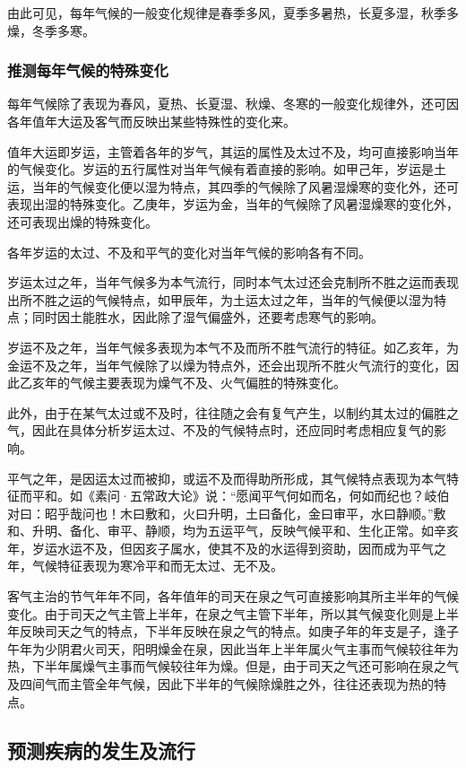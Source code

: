 \documentclass[12pt]{ctexbook}
\begin{document}
由此可见，每年气候的一般变化规律是春季多风，夏季多暑热，长夏多湿，秋季多燥，冬季多寒。

\subsubsection{推测每年气候的特殊变化}%

每年气候除了表现为春风，夏热、长夏湿、秋燥、冬寒的一般变化规律外，还可因各年值年大运及客气而反映出某些特殊性的变化来。

值年大运即岁运，主管着各年的岁气，其运的属性及太过不及，均可直接影响当年的气候变化。岁运的五行属性对当年气候有着直接的影响。如甲己年，岁运是土运，当年的气候变化便以湿为特点，其四季的气候除了风暑湿燥寒的变化外，还可表现出湿的特殊变化。乙庚年，岁运为金，当年的气候除了风暑湿燥寒的变化外，还可表现出燥的特殊变化。

各年岁运的太过、不及和平气的变化对当年气候的影响各有不同。

岁运太过之年，当年气候多为本气流行，同时本气太过还会克制所不胜之运而表现出所不胜之运的气候特点，如甲辰年，为土运太过之年，当年的气候便以湿为特点；同时因土能胜水，因此除了湿气偏盛外，还要考虑寒气的影响。

岁运不及之年，当年气候多表现为本气不及而所不胜气流行的特征。如乙亥年，为金运不及之年，当年气候除了以燥为特点外，还会出现所不胜火气流行的变化，因此乙亥年的气候主要表现为燥气不及、火气偏胜的特殊变化。

此外，由于在某气太过或不及时，往往随之会有复气产生，以制约其太过的偏胜之气，因此在具体分析岁运太过、不及的气候特点时，还应同时考虑相应复气的影响。

平气之年，是因运太过而被抑，或运不及而得助所形成，其气候特点表现为本气特征而平和。如《素问·五常政大论》说：“愿闻平气何如而名，何如而纪也？岐伯对曰：昭乎哉问也！木曰敷和，火曰升明，土曰备化，金曰审平，水曰静顺。”敷和、升明、备化、审平、静顺，均为五运平气，反映气候平和、生化正常。如辛亥年，岁运水运不及，但因亥子属水，使其不及的水运得到资助，因而成为平气之年，气候特征表现为寒冷平和而无太过、无不及。

客气主治的节气年年不同，各年值年的司天在泉之气可直接影响其所主半年的气候变化。由于司天之气主管上半年，在泉之气主管下半年，所以其气候变化则是上半年反映司天之气的特点，下半年反映在泉之气的特点。如庚子年的年支是子，逢子午年为少阴君火司天，阳明燥金在泉，因此当年上半年属火气主事而气候较往年为热，下半年属燥气主事而气候较往年为燥。但是，由于司天之气还可影响在泉之气及四间气而主管全年气候，因此下半年的气候除燥胜之外，往往还表现为热的特点。

\subsection{预测疾病的发生及流行}%
\end{document}
